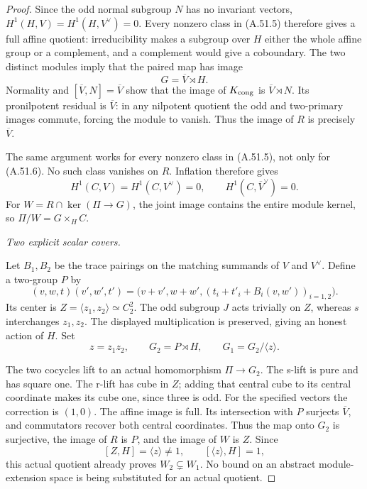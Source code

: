 \begin{proof}
Since the odd normal subgroup \(N\) has no
invariant vectors,
\(H^1(H,V)=H^1(H,V^\vee)=0\).
Every nonzero class in (A.51.5) therefore gives
a full affine quotient: irreducibility makes a
subgroup over \(H\) either the whole affine group
or a complement, and a complement would give a
coboundary. The two distinct modules imply that
the paired map has image
\[
                         G=\overline V\rtimes H.
\]
Normality and \([\overline V,N]=\overline V\)
show that the image of \(K_{\rm cong}\) is
\(\overline V\rtimes N\). Its pronilpotent
residual is \(\overline V\): in any nilpotent
quotient the odd and two-primary images commute,
forcing the module to vanish. Thus the image of
\(R\) is precisely \(\overline V\).

The same argument works for every nonzero class
in (A.51.5), not only for (A.51.6). No such class
vanishes on \(R\). Inflation therefore gives
\[
 H^1(C,V)=H^1(C,V^\vee)=0,
 \qquad H^1(C,\overline V^\vee)=0.
                                                               \tag{A.51.7}
\]
For \(W=R\cap\ker(\Pi\to G)\), the joint image
contains the entire module kernel, so
\(\Pi/W=G\times_H C\).

\emph{Two explicit scalar covers.}\par
Let \(B_1,B_2\) be the trace pairings on the
matching summands of \(V\) and \(V^\vee\).
Define a two-group \(P\) by
\[
 (v,w,t)(v',w',t')
  =\bigl(v+v',w+w',
     (t_i+t'_i+B_i(v,w'))_{i=1,2}\bigr).
                                                               \tag{A.51.8}
\]
Its center is \(Z=\langle z_1,z_2\rangle\simeq C_2^2\).
The odd subgroup \(J\) acts trivially on \(Z\),
whereas \(s\) interchanges \(z_1,z_2\).
The displayed multiplication is preserved, giving
an honest action of \(H\). Set
\[
 z=z_1z_2,\qquad G_2=P\rtimes H,
 \qquad G_1=G_2/\langle z\rangle.
                                                               \tag{A.51.9}
\]

The two cocycles lift to an actual homomorphism
\(\Pi\to G_2\). The s-lift is pure and has
square one. The r-lift has cube in \(Z\);
adding that central cube to its central coordinate
makes its cube one, since three is odd. For the
specified vectors the correction is \((1,0)\).
The affine image is full. Its intersection with
\(P\) surjects \(\overline V\), and commutators
recover both central coordinates. Thus the map
onto \(G_2\) is surjective, the image of \(R\)
is \(P\), and the image of \(W\) is \(Z\).
Since
\[
              [Z,H]=\langle z\rangle\ne1,
              \qquad [\langle z\rangle,H]=1,
\]
this actual quotient already proves
\(W_2\subsetneq W_1\). No bound on an abstract
module-extension space is being substituted for
an actual quotient.


\end{proof}
